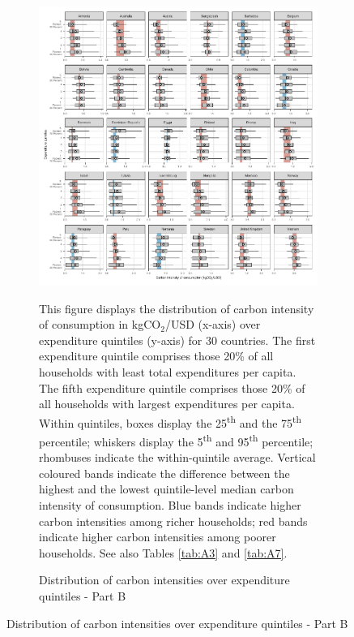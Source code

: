 \clearpage

\begin{figure}[ht!]\ContinuedFloat
   \begin{subfigure}[b]{\textwidth}
  \centering
  \includegraphics{1_Figures/Figures_Appendix/Figure_1_2017_Appendix_2.pdf}
  \caption{Distribution of carbon intensities over expenditure quintiles - Part B} \label{fig:Quint_B}
  \begin{subcaption2}
    This figure displays the distribution of carbon intensity of consumption in kgCO$_{2}$/USD (x-axis) over expenditure quintiles (y-axis) for 30 countries. The first expenditure quintile comprises those 20\% of all households with least total expenditures per capita. The fifth expenditure quintile comprises those 20\% of all households with largest expenditures per capita. Within quintiles, boxes display the 25\textsuperscript{th} and the 75\textsuperscript{th} percentile; whiskers display the 5\textsuperscript{th} and 95\textsuperscript{th} percentile; rhombuses indicate the within-quintile average. Vertical coloured bands indicate the difference between the highest and the lowest quintile-level median carbon intensity of consumption. Blue bands indicate higher carbon intensities among richer households; red bands indicate higher carbon intensities among poorer households. See also Tables \ref{tab:A3} and \ref{tab:A7}.
  \end{subcaption2}
\end{subfigure}
\end{figure}

